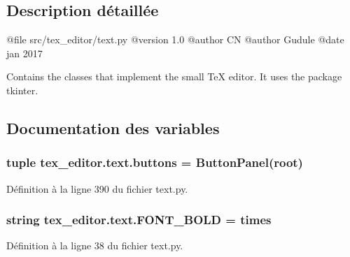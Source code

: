 \subsection{Description détaillée}
\begin{DoxyVerb}@file src/tex_editor/text.py
@version 1.0
@author CN
@author Gudule
@date jan 2017

Contains the classes that implement the small TeX editor.
It uses the package tkinter.\end{DoxyVerb}
 

\subsection{Documentation des variables}
\hypertarget{namespacetex__editor_1_1text_af96963df6d273be573113add17189a07}{}
\subsubsection[{buttons}]{\setlength{\rightskip}{0pt plus 5cm}tuple tex\+\_\+editor.\+text.\+buttons = {\bf Button\+Panel}({\bf root})}\label{namespacetex__editor_1_1text_af96963df6d273be573113add17189a07}


Définition à la ligne 390 du fichier text.\+py.

\hypertarget{namespacetex__editor_1_1text_a0d36f58bd021fa23bda70001db82820f}{}
\subsubsection[{F\+O\+N\+T\+\_\+\+B\+O\+L\+D}]{\setlength{\rightskip}{0pt plus 5cm}string tex\+\_\+editor.\+text.\+F\+O\+N\+T\+\_\+\+B\+O\+L\+D = \textquotesingle{}times\textquotesingle{}}\label{namespacetex__editor_1_1text_a0d36f58bd021fa23bda70001db82820f}


Définition à la ligne 38 du fichier text.\+py.

\hypertarget{namespacetex__editor_1_1text_a092a6d860a959ef17dfa70c0c374bd44}{}
